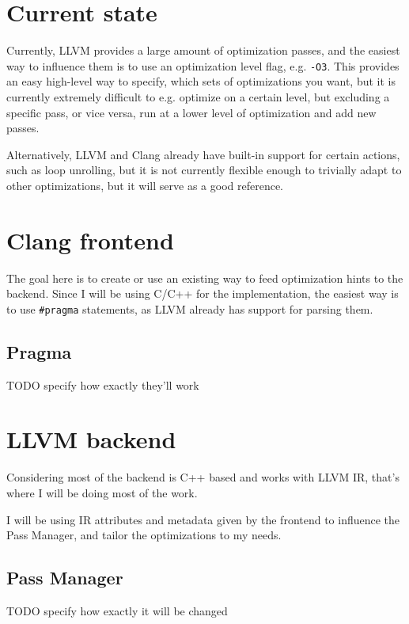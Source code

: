 \section{Current state}
Currently, LLVM provides a large amount of optimization passes, and the easiest way to influence them is to use an optimization level flag, e.g. \texttt{-O3}. This provides an easy high-level way to specify, which sets of optimizations you want, but it is currently extremely difficult to e.g. optimize on a certain level, but excluding a specific pass, or vice versa, run at a lower level of optimization and add new passes.

Alternatively, LLVM and Clang already have built-in support for certain actions, such as loop unrolling, but it is not currently flexible enough to trivially adapt to other optimizations, but it will serve as a good reference.

\section{Clang frontend}
The goal here is to create or use an existing way to feed optimization hints to the backend. Since I will be using C/C++ for the implementation, the easiest way is to use \texttt{\#pragma} statements, as LLVM already has support for parsing them.

\subsection{Pragma}
TODO specify how exactly they'll work

\section{LLVM backend}
Considering most of the backend is C++ based and works with LLVM IR, that's where I will be doing most of the work.

I will be using IR attributes and metadata given by the frontend to influence the Pass Manager, and tailor the optimizations to my needs.

\subsection{Pass Manager}
TODO specify how exactly it will be changed